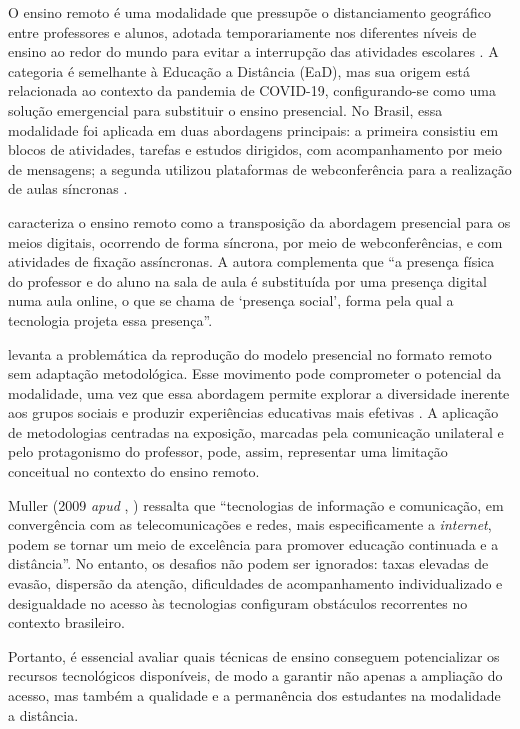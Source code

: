 O ensino remoto é uma modalidade que pressupõe o distanciamento geográfico entre professores e alunos, adotada temporariamente nos diferentes níveis de ensino ao redor do mundo para evitar a interrupção das atividades escolares \cite{beharArtigoEnsinoRemoto2020}. A categoria é semelhante à Educação a Distância (EaD), mas sua origem está relacionada ao contexto da pandemia de COVID-19, configurando-se como uma solução emergencial para substituir o ensino presencial. No Brasil, essa modalidade foi aplicada em duas abordagens principais: a primeira consistiu em blocos de atividades, tarefas e estudos dirigidos, com acompanhamento por meio de mensagens; a segunda utilizou plataformas de webconferência para a realização de aulas síncronas \cite{santosEducacaoDistanciaEnsino2022}.

 caracteriza o ensino remoto como a transposição da abordagem presencial para os meios digitais, ocorrendo de forma síncrona, por meio de webconferências, e com atividades de fixação assíncronas. A autora complementa que “a presença física do professor e do aluno na sala de aula é substituída por uma presença digital numa aula online, o que se chama de ‘presença social’, forma pela qual a tecnologia projeta essa presença”.

 levanta a problemática da reprodução do modelo presencial no formato remoto sem adaptação metodológica. Esse movimento pode comprometer o potencial da modalidade, uma vez que essa abordagem permite explorar a diversidade inerente aos grupos sociais e produzir experiências educativas mais efetivas \cite{belloniEnsaioSobreEducacao2002}. A aplicação de metodologias centradas na exposição, marcadas pela comunicação unilateral e pelo protagonismo do professor, pode, assim, representar uma limitação conceitual no contexto do ensino remoto.

Muller (2009 \textit{apud} \citeauthor{vasconcelosEstrategiasEnsinoAplicaveis2013}, \citeyear{vasconcelosEstrategiasEnsinoAplicaveis2013}) ressalta que “tecnologias de informação e comunicação, em convergência com as telecomunicações e redes, mais especificamente a \textit{internet}, podem se tornar um meio de excelência para promover educação continuada e a distância”. No entanto, os desafios não podem ser ignorados: taxas elevadas de evasão, dispersão da atenção, dificuldades de acompanhamento individualizado e desigualdade no acesso às tecnologias configuram obstáculos recorrentes no contexto brasileiro.

Portanto, é essencial avaliar quais técnicas de ensino conseguem potencializar os recursos tecnológicos disponíveis, de modo a garantir não apenas a ampliação do acesso, mas também a qualidade e a permanência dos estudantes na modalidade a distância.